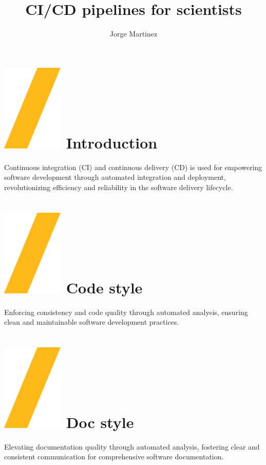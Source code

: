 \documentclass[a0paper,fleqn]{src/betterposter}
\begin{document}
{\title{CI\slash CD pipelines for scientists}
\author{Jorge Martinez}

\section{\includegraphics[height=\fontcharht\font`\S]{img/general/slash.png} Introduction}
Continuous integration (CI) and continuous delivery (CD) is used for empowering
software development through automated integration and deployment,
revolutionizing efficiency and reliability in the software delivery lifecycle.

\section{\includegraphics[height=\fontcharht\font`\S]{img/general/slash.png} Code style}
Enforcing consistency and code quality through automated analysis, ensuring
clean and maintainable software development practices.

\section{\includegraphics[height=\fontcharht\font`\S]{img/general/slash.png} Doc style}
Elevating documentation quality through automated analysis, fostering clear and
consistent communication for comprehensive software documentation.

}
\end{document}
